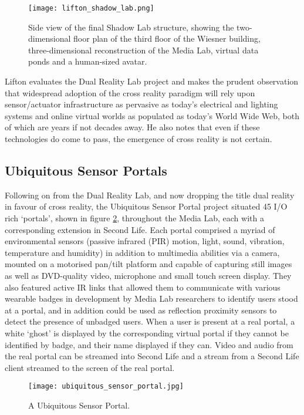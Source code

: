 \begin{figure}[h]
\centering
\texttt{[image: lifton\_shadow\_lab.png]}
\caption{Side view of the final Shadow Lab structure, showing the two-dimensional floor plan of the third floor of the Wiesner building, three-dimensional reconstruction of the Media Lab, virtual data ponds and a human-sized avatar.}
\label{lifton_shadow_lab.png}
\end{figure}

Lifton evaluates the Dual Reality Lab project and makes the prudent observation that widespread adoption of the cross reality paradigm will rely upon sensor/actuator infrastructure as pervasive as today's electrical and lighting systems and online virtual worlds as populated as today's World Wide Web, both of which are years if not decades away. He also notes that even if these technologies do come to pass, the emergence of cross reality is not certain.

\subsection{Ubiquitous Sensor Portals}
Following on from the Dual Reality Lab, and now dropping the title dual reality in favour of cross reality, the Ubiquitous Sensor Portal project situated 45 I/O rich `portals', shown in figure \ref{ubiquitous_sensor_portal.jpg}, throughout the Media Lab, each with a corresponding extension in Second Life. Each portal comprised a myriad of environmental sensors (passive infrared (PIR) motion, light, sound, vibration, temperature and humidity) in addition to multimedia abilities via a camera, mounted on a motorised pan/tilt platform and capable of capturing still images as well as DVD-quality video, microphone and small touch screen display. They also featured active IR links that allowed them to communicate with various wearable badges in development by Media Lab researchers to identify users stood at a portal, and in addition could be used as reflection proximity sensors to detect the presence of unbadged users. When a user is present at a real portal, a white `ghost' is displayed by the corresponding virtual portal if they cannot be identified by badge, and their name displayed if they can. Video and audio from the real portal can be streamed into Second Life and a stream from a Second Life client streamed to the screen of the real portal.

\begin{figure}[h]
\centering
\texttt{[image: ubiquitous\_sensor\_portal.jpg]}
\caption{A Ubiquitous Sensor Portal.}
\label{ubiquitous_sensor_portal.jpg}
\end{figure}

